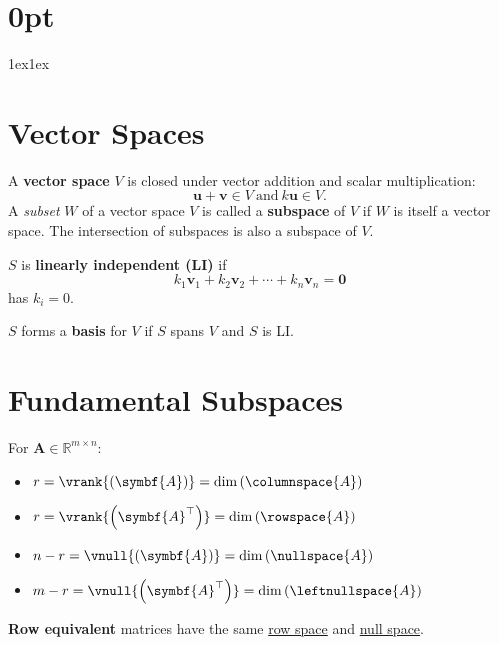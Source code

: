 \documentclass{article}
\begin{document}
\titlespacing*\section{0pt}{1ex}{1ex}
%
\setlength{\textfloatsep}{0pt}
%
\setlength{\abovedisplayskip}{1pt}
\setlength{\belowdisplayskip}{1pt}
%
\begin{minipage}[t]{62.39259259mm}
    \section*{Vector Spaces}
    A \textbf{vector space} \(V\) is closed under vector addition
    and scalar multiplication:
    \begin{equation*}
        \symbf{u}+\symbf{v} \in V \ \text{and} \ k\symbf{u} \in V.
    \end{equation*}
    A \textit{subset} \(W\) of a vector space \(V\) is called a
    \textbf{subspace} of \(V\) if \(W\) is itself a vector space. The
    intersection of subspaces is also a subspace of \(V\).

    \(S\) is \textbf{linearly independent (LI)} if
    \begin{equation*}
        k_1 \symbf{v}_1 + k_2 \symbf{v}_2 + \cdots + k_n \symbf{v}_n = \symbf{0}
    \end{equation*}
    has \(k_i=0\).

    \(S\) forms a \textbf{basis} for \(V\) if \(S\) spans \(V\) and \(S\) is LI\@.
    \section*{Fundamental Subspaces}
    For \(\symbf{A}\in\mathbb{R}^{m \times n}\):
    \begin{itemize}
        \item \(r = \vrank{\left( \symbf{A} \right)} = \dim{\left( \columnspace{A} \right)}\)
        \item \(r = \vrank{\left( \symbf{A}^\top \right)} = \dim{\left( \rowspace{A} \right)}\)
        \item \(n - r = \vnull{\left( \symbf{A} \right)}      = \dim{\left( \nullspace{A} \right)}\)
        \item \(m - r = \vnull{\left( \symbf{A}^\top \right)} = \dim{\left( \leftnullspace{A} \right)}\)
    \end{itemize}
    \textbf{Row equivalent} matrices have the same
    \underline{row space} and \underline{null space}.

\end{minipage}
\end{document}
